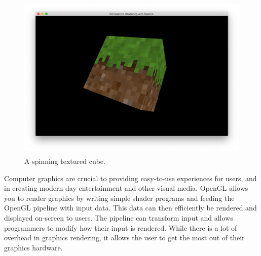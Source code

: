 \documentclass{article}
\begin{document}
\begin{figure}[h]
    \centering
    \includegraphics[height=8cm]{textured-cube.png}
	\caption{A spinning textured cube.}
	\label{fig:final-product}
\end{figure}

Computer graphics are crucial to providing easy-to-use experiences for users, and in creating modern day entertainment and other visual media. OpenGL allows you to render graphics by writing simple shader programs and feeding the OpenGL pipeline with input data. This data can then efficiently be rendered and displayed on-screen to users. The pipeline can transform input and allows programmers to modify how their input is rendered. While there is a lot of overhead in graphics rendering, it allows the user to get the most out of their graphics hardware.

\clearpage

{}

\end{document}
